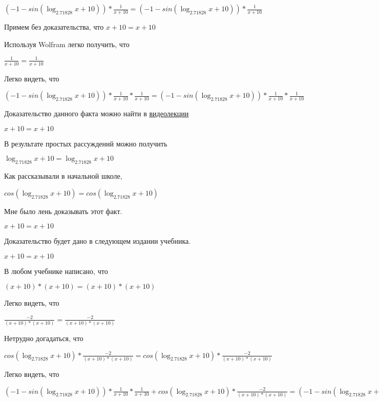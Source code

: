 \documentclass[12pt,a4paper,fleqn]{article}
\theoremstyle{definition}
\begin{document}
$( -1  - sin(\log_{ 2.71828 }{ x  +  10 })) * \frac{ 1 }{ x  +  10 }
 = ( -1  - sin(\log_{ 2.71828 }{ x  +  10 })) * \frac{ 1 }{ x  +  10 }
$

Примем без доказательства, что
$ x  +  10  =  x  +  10 $

Используя Wolfram легко получить, что

$\frac{ 1 }{ x  +  10 }
 = \frac{ 1 }{ x  +  10 }
$

Легко видеть, что

$( -1  - sin(\log_{ 2.71828 }{ x  +  10 })) * \frac{ 1 }{ x  +  10 }
 * \frac{ 1 }{ x  +  10 }
 = ( -1  - sin(\log_{ 2.71828 }{ x  +  10 })) * \frac{ 1 }{ x  +  10 }
 * \frac{ 1 }{ x  +  10 }
$

Доказательство данного факта можно найти в \href{https://www.youtube.com/watch?v=dQw4w9WgXcQ}{видеолекции}

$ x  +  10  =  x  +  10 $

В результате простых рассуждений можно получить

$\log_{ 2.71828 }{ x  +  10 } = \log_{ 2.71828 }{ x  +  10 }$

Как рассказывали в начальной школе,

$cos(\log_{ 2.71828 }{ x  +  10 }) = cos(\log_{ 2.71828 }{ x  +  10 })$

Мне было лень доказывать этот факт.

$ x  +  10  =  x  +  10 $

Доказательство будет дано в следующем издании учебника.

$ x  +  10  =  x  +  10 $

В любом учебнике написано, что

$( x  +  10 ) * ( x  +  10 ) = ( x  +  10 ) * ( x  +  10 )$

Легко видеть, что

$\frac{ -2 }{( x  +  10 ) * ( x  +  10 )}
 = \frac{ -2 }{( x  +  10 ) * ( x  +  10 )}
$

Нетрудно догадаться, что

$cos(\log_{ 2.71828 }{ x  +  10 }) * \frac{ -2 }{( x  +  10 ) * ( x  +  10 )}
 = cos(\log_{ 2.71828 }{ x  +  10 }) * \frac{ -2 }{( x  +  10 ) * ( x  +  10 )}
$

Легко видеть, что

$( -1  - sin(\log_{ 2.71828 }{ x  +  10 })) * \frac{ 1 }{ x  +  10 }
 * \frac{ 1 }{ x  +  10 }
 + cos(\log_{ 2.71828 }{ x  +  10 }) * \frac{ -2 }{( x  +  10 ) * ( x  +  10 )}
 = ( -1  - sin(\log_{ 2.71828 }{ x  +  10 })) * \frac{ 1 }{ x  +  10 }
 * \frac{ 1 }{ x  +  10 }
 + cos(\log_{ 2.71828 }{ x  +  10 }) * \frac{ -2 }{( x  +  10 ) * ( x  +  10 )}
$
\end{document}
